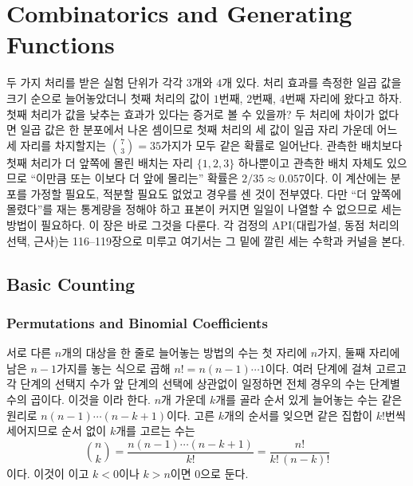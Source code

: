 \chapter{Combinatorics and Generating Functions}
\label{ch:combinatorics}

\providecommand\qbinom[2]{\genfrac{[}{]}{0pt}{}{#1}{#2}_{q}}


두 가지 처리를 받은 실험 단위가 각각 $3$개와 $4$개 있다. 처리 효과를 측정한 일곱 값을 크기 순으로 늘어놓았더니 첫째 처리의 값이 $1$번째, $2$번째, $4$번째 자리에 왔다고 하자. 첫째 처리가 값을 낮추는 효과가 있다는 증거로 볼 수 있을까? 두 처리에 차이가 없다면 일곱 값은 한 분포에서 나온 셈이므로 첫째 처리의 세 값이 일곱 자리 가운데 어느 세 자리를 차지할지는 $\binom73=35$가지가 모두 같은 확률로 일어난다. 관측한 배치보다 첫째 처리가 더 앞쪽에 몰린 배치는 자리 $\{1,2,3\}$ 하나뿐이고 관측한 배치 자체도 있으므로 ``이만큼 또는 이보다 더 앞에 몰리는'' 확률은 $2/35\approx0.057$이다. 이 계산에는 분포를 가정할 필요도, 적분할 필요도 없었고 경우를 센 것이 전부였다. 다만 ``더 앞쪽에 몰렸다''를 재는 통계량을 정해야 하고 표본이 커지면 일일이 나열할 수 없으므로 세는 방법이 필요하다. 이 장은 바로 그것을 다룬다. 각 검정의 API(대립가설, 동점 처리의 선택, 근사)는 116--119장으로 미루고 여기서는 그 밑에 깔린 세는 수학과 커널을 본다.

\section{Basic Counting}
\label{sec:counting}

\subsection{Permutations and Binomial Coefficients}

서로 다른 $n$개의 대상을 한 줄로 늘어놓는 방법의 수는 첫 자리에 $n$가지, 둘째 자리에 남은 $n-1$가지를 놓는 식으로 곱해 $n!=n(n-1)\cdots1$이다. 여러 단계에 걸쳐 고르고 각 단계의 선택지 수가 앞 단계의 선택에 상관없이 일정하면 전체 경우의 수는 단계별 수의 곱이다. 이것을 이라 한다. $n$개 가운데 $k$개를 골라 순서 있게 늘어놓는 수는 같은 원리로 $n(n-1)\cdots(n-k+1)$이다. 고른 $k$개의 순서를 잊으면 같은 집합이 $k!$번씩 세어지므로 순서 없이 $k$개를 고르는 수는
\[
\binom nk=\frac{n(n-1)\cdots(n-k+1)}{k!}=\frac{n!}{k!\,(n-k)!}
\]
이다. 이것이 이고 $k<0$이나 $k>n$이면 $0$으로 둔다.


